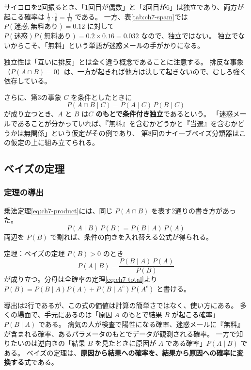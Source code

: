 サイコロを2回振るとき、「1回目が偶数」と「2回目が6」は独立であり、両方が起こる確率は $\frac{1}{2} \cdot \frac{1}{6} = \frac{1}{12}$ である。
一方、表\ref{tab:ch7-spam}では $P(\text{迷惑}, \text{無料あり}) = 0.12$ に対して $P(\text{迷惑})P(\text{無料あり}) = 0.2 \times 0.16 = 0.032$ なので、独立ではない。
独立でないからこそ、「無料」という単語が迷惑メールの手がかりになる。

独立性は「互いに排反」とは全く違う概念であることに注意する。
排反な事象（$P(A \cap B) = 0$）は、一方が起きれば他方は決して起きないので、むしろ強く依存している。

さらに、第3の事象 $C$ を条件としたときに
\begin{equation}
  P(A \cap B \mid C) = P(A \mid C)\,P(B \mid C)
  \label{eq:ch7-cond-indep}
\end{equation}
が成り立つとき、$A$ と $B$ は\textbf{$C$ のもとで条件付き独立}であるという。
「迷惑メールであることが分かっていれば、『無料』を含むかどうかと『当選』を含むかどうかは無関係」という仮定がその例であり、
第8回のナイーブベイズ分類器はこの仮定の上に組み立てられる。


\subsection{ベイズの定理}

\subsubsection{定理の導出}

乗法定理\eqref{eq:ch7-product}には、同じ $P(A \cap B)$ を表す2通りの書き方があった。
\begin{equation*}
  P(A \mid B)\,P(B) = P(B \mid A)\,P(A)
\end{equation*}
両辺を $P(B)$ で割れば、条件の向きを入れ替える公式が得られる。

\begin{itembox}[l]{定理：ベイズの定理}
$P(B) > 0$ のとき
\begin{equation}
  P(A \mid B) = \frac{P(B \mid A)\,P(A)}{P(B)}
  \label{eq:ch7-bayes}
\end{equation}
が成り立つ。分母は全確率の定理\eqref{eq:ch7-total}より
$P(B) = P(B \mid A)P(A) + P(B \mid A^c)P(A^c)$ と書ける。
\end{itembox}

導出は2行であるが、この式の価値は計算の簡単さではなく、使い方にある。
多くの場面で、手元にあるのは「原因 $A$ のもとで結果 $B$ が起こる確率」$P(B \mid A)$ である。
病気の人が検査で陽性になる確率、迷惑メールに『無料』が含まれる確率、あるパラメータのもとでデータが観測される確率。
一方で知りたいのは逆向きの「結果 $B$ を見たときに原因が $A$ である確率」$P(A \mid B)$ である。
ベイズの定理は、\textbf{原因から結果への確率を、結果から原因への確率に変換する}式である。

